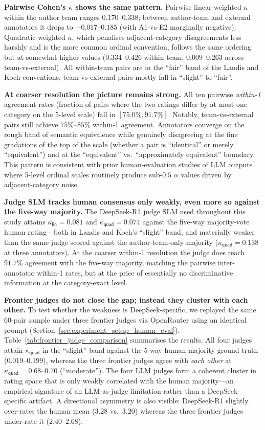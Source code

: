 \textbf{Pairwise Cohen's $\kappa$ shows the same pattern.} Pairwise
linear-weighted $\kappa$ within the author team ranges $0.170$--$0.338$;
between author-team and external annotators it drops to $-0.017$--$0.185$
(with A1-vs-E2 marginally negative). Quadratic-weighted $\kappa$, which
penalises adjacent-category disagreements less harshly and is the more
common ordinal convention, follows the same ordering but at somewhat
higher values ($0.334$--$0.426$ within team; $0.009$--$0.263$
across team-vs-external). All within-team pairs are in the ``fair'' band
of the Landis and Koch conventions; team-vs-external pairs mostly fall
in ``slight'' to ``fair''.

\textbf{At coarser resolution the picture remains strong.} All ten
pairwise \emph{within-1} agreement rates (fraction of pairs where the
two ratings differ by at most one category on the 5-level scale) fall
in $[75.0\%, 91.7\%]$. Notably, team-vs-external pairs still achieve
$75\%$--$85\%$ within-1 agreement. Annotators converge on the rough
band of semantic equivalence while genuinely disagreeing at the fine
gradations of the top of the scale (whether a pair is ``identical'' or
merely ``equivalent'') and at the ``equivalent'' vs.\ ``approximately
equivalent'' boundary. This pattern is consistent with prior
human-evaluation studies of LLM outputs where 5-level ordinal scales
routinely produce sub-$0.5$ $\alpha$ values driven by
adjacent-category noise.

\textbf{Judge SLM tracks human consensus only weakly, even more so
against the five-way majority.} The DeepSeek-R1 judge SLM used
throughout this study attains
$\kappa_{\textsf{lin}} = 0.081$ and $\kappa_{\textsf{quad}} = 0.074$
against the five-way majority-vote human rating---both in Landis and
Koch's ``slight'' band, and materially weaker than the same judge
scored against the author-team-only majority
($\kappa_{\textsf{quad}} = 0.138$ at three annotators). At the coarser
within-1 resolution the judge does reach $91.7\%$ agreement with the
five-way majority, matching the pairwise inter-annotator within-1 rates,
but at the price of essentially no discriminative information at the
category-exact level.

\textbf{Frontier judges do not close the gap; instead they cluster with
each other.} To test whether the weakness is DeepSeek-specific, we
replayed the same 60-pair sample under three frontier judges via
OpenRouter using an identical prompt (Section~\ref{sec:experiment_setup_human_eval}).
Table~\ref{tab:frontier_judge_comparison} summarises the results. All
four judges attain $\kappa_{\textsf{quad}}$ in the ``slight'' band
against the 5-way human-majority ground truth ($0.019$--$0.199$),
whereas the three frontier judges agree with \emph{each other} at
$\kappa_{\textsf{quad}} = 0.68$--$0.70$ (``moderate''). The four LLM
judges form a coherent cluster in rating space that is only weakly
correlated with the human majority---an empirical signature of an
LLM-as-judge limitation rather than a DeepSeek-specific artifact. A
directional asymmetry is also visible: DeepSeek-R1 slightly over-rates
the human mean ($3.28$ vs.\ $3.20$) whereas the three frontier judges
under-rate it ($2.40$--$2.68$).

